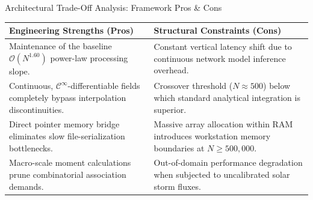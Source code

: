 \documentclass[presentation,10pt,aspectratio=169]{beamer}
\begin{document}
\begin{frame}{Architectural Trade-Off Analysis: Framework Pros \& Cons}
    \vspace*{-0.4cm}
    \begin{table}
        \footnotesize
        \centering
        \begin{tabular}{p{} p{}}
            \toprule
            \textbf{Engineering Strengths (Pros)} & \textbf{Structural Constraints (Cons)} \\
            \midrule
            Maintenance of the baseline $\mathcal{O}(N^{1.60})$ power-law processing slope. & Constant vertical latency shift due to continuous network model inference overhead. \\ \addlinespace
            Continuous, $\mathcal{C}^\infty$-differentiable fields completely bypass interpolation discontinuities. & Crossover threshold ($N \approx 500$) below which standard analytical integration is superior. \\ \addlinespace
            Direct pointer memory bridge eliminates slow file-serialization bottlenecks. & Massive array allocation within RAM introduces workstation memory boundaries at $N \ge 500,000$. \\ \addlinespace
            Macro-scale moment calculations prune combinatorial association demands. & Out-of-domain performance degradation when subjected to uncalibrated solar storm fluxes. \\
            \bottomrule
        \end{tabular}
    \end{table}
\end{frame}
\end{document}

